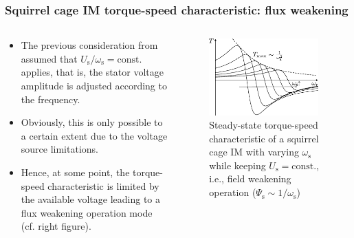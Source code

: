 \begin{frame}
	\frametitle{Squirrel cage IM torque-speed characteristic: flux weakening}
    \begin{columns}
		\begin{column}{0.5\textwidth}
	      \begin{itemize}
            \item<1-> The previous consideration from  assumed that $U_\mathrm{s}/\omega_\mathrm{s}=\mathrm{const.}$ applies, that is, the stator voltage amplitude is adjusted according to the frequency.
            \item<2-> Obviously, this is only possible to a certain extent due to the voltage source limitations.
            \item<3-> Hence, at some point, the torque-speed characteristic is limited by the available voltage leading to a flux weakening operation mode (cf. right figure).
          \end{itemize}
        \end{column}
        \begin{column}{0.5\textwidth}
            \begin{figure}
                \centering
                \includegraphics[width=0.95\textwidth]{fig/lec06/Kloss_formula_different_excitation_frequencies_field_weakening.pdf}
                \caption{Steady-state torque-speed characteristic of a squirrel cage IM with varying $\omega_\mathrm{s}$ while keeping $U_\mathrm{s}=\mathrm{const.}$, i.e., field weakening operation ($\Psi_\mathrm{s}\sim 1/\omega_\mathrm{s}$)} 
                \label{fig:Kloss_formula_different_excitation_frequencies_field_weakening}
            \end{figure}
        \end{column}
    \end{columns}
\end{frame}

